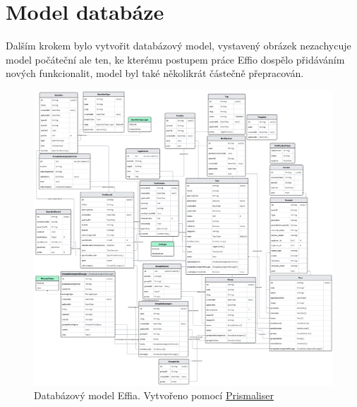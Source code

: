 \documentclass[12pt, a4paper,
openright
]{report}
\begin{document}
\section{Model databáze}
Dalším krokem bylo vytvořit databázový model, vystavený obrázek nezachycuje model počáteční ale ten, ke kterému postupem práce Effio dospělo přidáváním nových funkcionalit, model byl také několikrát částečně přepracován.
\begin{figure}[H]
	\centering %
	\includegraphics[width=1\linewidth]{image/schema.png} 
	\caption{Databázový model Effia. Vytvořeno pomocí \href{https://github.com/Ovyerus/prismaliser}{Prismaliser}} %
	\label{fig:schema} %
\end{figure}
\clearpage
\end{document}
